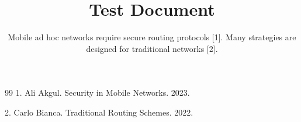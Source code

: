 \documentclass{default}
\begin{document}
\journalheader

\title{Test Document}
\author{Mobile ad hoc networks require secure routing protocols [1]. Many strategies are designed for traditional networks [2].}
\date{}
\maketitle

\begin{abstract}

\end{abstract}



\begin{thebibliography}{99}
1. Ali Akgul. Security in Mobile Networks. 2023.

2. Carlo Bianca. Traditional Routing Schemes. 2022.

\end{thebibliography}
\end{document}
